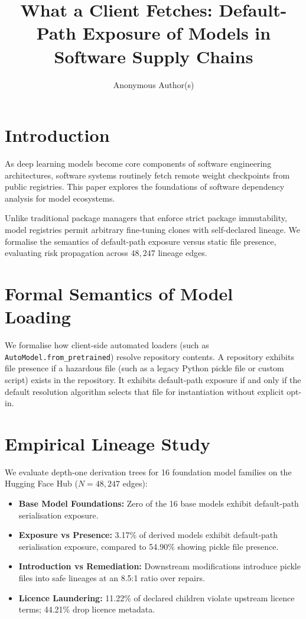 \documentclass[sigconf,review,anonymous]{acmart}
\title{What a Client Fetches: Default-Path Exposure of Models in Software Supply Chains}
\author{Anonymous Author(s)}
\affiliation{%
  \institution{Anonymous Institution}
  \country{Anonymous Country}
}
\begin{document}
\maketitle

\section{Introduction}
As deep learning models become core components of software engineering architectures, software systems routinely fetch remote weight checkpoints from public registries. This paper explores the foundations of software dependency analysis for model ecosystems. 

Unlike traditional package managers that enforce strict package immutability, model registries permit arbitrary fine-tuning clones with self-declared lineage. We formalise the semantics of default-path exposure versus static file presence, evaluating risk propagation across $48{,}247$ lineage edges.

\section{Formal Semantics of Model Loading}
We formalise how client-side automated loaders (such as \texttt{AutoModel.from\_pretrained}) resolve repository contents. A repository exhibits file presence if a hazardous file (such as a legacy Python pickle file or custom script) exists in the repository. It exhibits default-path exposure if and only if the default resolution algorithm selects that file for instantiation without explicit opt-in.

\section{Empirical Lineage Study}
We evaluate depth-one derivation trees for 16 foundation model families on the Hugging Face Hub ($N = 48{,}247$ edges):
\begin{itemize}
    \item \textbf{Base Model Foundations:} Zero of the 16 base models exhibit default-path serialisation exposure.
    \item \textbf{Exposure vs Presence:} 3.17\% of derived models exhibit default-path serialisation exposure, compared to 54.90\% showing pickle file presence.
    \item \textbf{Introduction vs Remediation:} Downstream modifications introduce pickle files into safe lineages at an 8.5:1 ratio over repairs.
    \item \textbf{Licence Laundering:} 11.22\% of declared children violate upstream licence terms; 44.21\% drop licence metadata.
\end{itemize}
\end{document}
